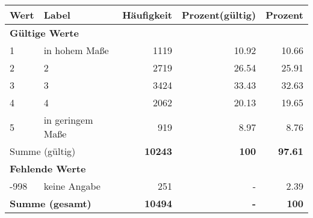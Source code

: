      \begin{longtable}{lXrrr}
     \toprule
     \textbf{Wert} & \textbf{Label} & \textbf{Häufigkeit} & \textbf{Prozent(gültig)} & \textbf{Prozent} \\
     \endhead
     \midrule
     \multicolumn{5}{l}{\textbf{Gültige Werte}}\\

     1 &
     \multicolumn{1}{X}{ in hohem Maße   } &


       \num{1119} &
       \num[round-mode=places,round-precision=2]{10,92} &
         \num[round-mode=places,round-precision=2]{10,66} \\

     2 &
     \multicolumn{1}{X}{ 2   } &


       \num{2719} &
       \num[round-mode=places,round-precision=2]{26,54} &
         \num[round-mode=places,round-precision=2]{25,91} \\

     3 &
     \multicolumn{1}{X}{ 3   } &


       \num{3424} &
       \num[round-mode=places,round-precision=2]{33,43} &
         \num[round-mode=places,round-precision=2]{32,63} \\

     4 &
     \multicolumn{1}{X}{ 4   } &


       \num{2062} &
       \num[round-mode=places,round-precision=2]{20,13} &
         \num[round-mode=places,round-precision=2]{19,65} \\

     5 &
     \multicolumn{1}{X}{ in geringem Maße   } &


       \num{919} &
       \num[round-mode=places,round-precision=2]{8,97} &
         \num[round-mode=places,round-precision=2]{8,76} \\
     \midrule
     \multicolumn{2}{l}{Summe (gültig)} &
       \textbf{\num{10243}} &
     \textbf{100} &
       \textbf{\num[round-mode=places,round-precision=2]{97,61}} \\
     \multicolumn{5}{l}{\textbf{Fehlende Werte}}\\
       -998 &
       keine Angabe &
         \num{251} &
        - &
         \num[round-mode=places,round-precision=2]{2,39} \\
     \midrule
     \multicolumn{2}{l}{\textbf{Summe (gesamt)}} &
          \textbf{\num{10494}} &
        \textbf{-} &
        \textbf{100} \\
     \bottomrule
     \end{longtable}
     
